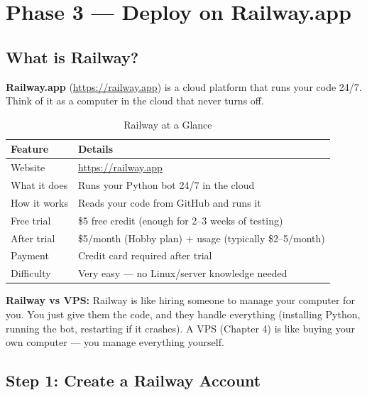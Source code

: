 
\chapter{Phase 3 --- Deploy on Railway.app}

\section{What is Railway?}

\textbf{Railway.app} (\url{https://railway.app}) is a cloud platform that runs your code 24/7. Think of it as a computer in the cloud that never turns off.

\begin{table}[H]
\centering
\caption{Railway at a Glance}
\begin{tabularx}{\textwidth}{|l|X|}
\hline
\textbf{Feature} & \textbf{Details} \\
\hline
Website & \url{https://railway.app} \\
\hline
What it does & Runs your Python bot 24/7 in the cloud \\
\hline
How it works & Reads your code from GitHub and runs it \\
\hline
Free trial & \$5 free credit (enough for 2--3 weeks of testing) \\
\hline
After trial & \$5/month (Hobby plan) + usage (typically \$2--5/month) \\
\hline
Payment & Credit card required after trial \\
\hline
Difficulty & Very easy --- no Linux/server knowledge needed \\
\hline
\end{tabularx}
\end{table}

\begin{infobox}
\textbf{Railway vs VPS:} Railway is like hiring someone to manage your computer for you. You just give them the code, and they handle everything (installing Python, running the bot, restarting if it crashes). A VPS (Chapter 4) is like buying your own computer --- you manage everything yourself.
\end{infobox}

\section{Step 1: Create a Railway Account}

